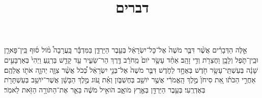 \documentclass{openreader}
\title{דברים}
\date{}
\begin{document}
\maketitle
\raggedbottom 
\fontsize{16pt}{24pt}\selectfont


אֵ֣לֶּה הַדְּבָרִ֗ים אֲשֶׁ֨ר דִּבֶּ֤ר מֹשֶׁה֙ אֶל־כָּל־יִשְׂרָאֵ֔ל בְּעֵ֖בֶר הַיַּרְדֵּ֑ן בַּמִּדְבָּ֡ר בָּֽעֲרָבָה֩ מֹ֨ול ס֜וּף בֵּֽין־פָּארָ֧ן וּבֵֽין־תֹּ֛פֶל וְלָבָ֥ן וַחֲצֵרֹ֖ת וְדִ֥י זָהָֽב׃ 
אַחַ֨ד עָשָׂ֥ר יֹום֙ מֵֽחֹרֵ֔ב דֶּ֖רֶךְ הַר־שֵׂעִ֑יר עַ֖ד קָדֵ֥שׁ בַּרְנֵֽעַ׃ 
וַיְהִי֙ בְּאַרְבָּעִ֣ים שָׁנָ֔ה בְּעַשְׁתֵּֽי־עָשָׂ֥ר חֹ֖דֶשׁ בְּאֶחָ֣ד לַחֹ֑דֶשׁ דִּבֶּ֤ר מֹשֶׁה֙ אֶל־בְּנֵ֣י יִשְׂרָאֵ֔ל כְּ֠כֹל אֲשֶׁ֨ר צִוָּ֧ה יְהוָ֛ה אֹתֹ֖ו אֲלֵהֶֽם׃ 
אַחֲרֵ֣י הַכֹּתֹ֗ו אֵ֚ת סִיחֹן֙ מֶ֣לֶךְ הָֽאֱמֹרִ֔י אֲשֶׁ֥ר יֹושֵׁ֖ב בְּחֶשְׁבֹּ֑ון וְאֵ֗ת עֹ֚וג מֶ֣לֶךְ הַבָּשָׁ֔ן אֲשֶׁר־יֹושֵׁ֥ב בְּעַשְׁתָּרֹ֖ת בְּאֶדְרֶֽעִי׃ 
בְּעֵ֥בֶר הַיַּרְדֵּ֖ן בְּאֶ֣רֶץ מֹואָ֑ב הֹואִ֣יל מֹשֶׁ֔ה בֵּאֵ֛ר אֶת־הַתֹּורָ֥ה הַזֹּ֖את לֵאמֹֽר׃ 
\end{document}
